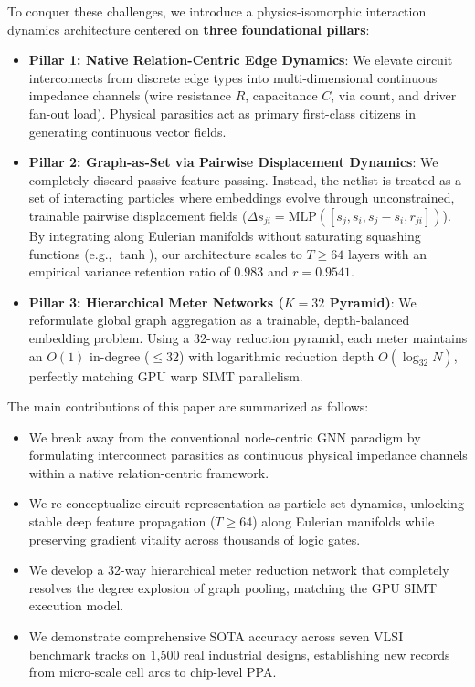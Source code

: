 \documentclass[conference]{IEEEtran}
\begin{document}
To conquer these challenges, we introduce a physics-isomorphic interaction dynamics architecture centered on \textbf{three foundational pillars}:
\begin{itemize}
    \item \textbf{Pillar 1: Native Relation-Centric Edge Dynamics}: We elevate circuit interconnects from discrete edge types into multi-dimensional continuous impedance channels (wire resistance $R$, capacitance $C$, via count, and driver fan-out load). Physical parasitics act as primary first-class citizens in generating continuous vector fields.
    \item \textbf{Pillar 2: Graph-as-Set via Pairwise Displacement Dynamics}: We completely discard passive feature passing. Instead, the netlist is treated as a set of interacting particles where embeddings evolve through unconstrained, trainable pairwise displacement fields ($\Delta s_{ji} = \text{MLP}([s_j, s_i, s_j - s_i, r_{ji}])$). By integrating along Eulerian manifolds without saturating squashing functions (e.g., $\tanh$), our architecture scales to $T \ge 64$ layers with an empirical variance retention ratio of $0.983$ and $r = 0.9541$.
    \item \textbf{Pillar 3: Hierarchical Meter Networks ($K=32$ Pyramid)}: We reformulate global graph aggregation as a trainable, depth-balanced embedding problem. Using a 32-way reduction pyramid, each meter maintains an $O(1)$ in-degree ($\le 32$) with logarithmic reduction depth $O(\log_{32} N)$, perfectly matching GPU warp SIMT parallelism.
\end{itemize}

The main contributions of this paper are summarized as follows:
\begin{itemize}
    \item We break away from the conventional node-centric GNN paradigm by formulating interconnect parasitics as continuous physical impedance channels within a native relation-centric framework.
    \item We re-conceptualize circuit representation as particle-set dynamics, unlocking stable deep feature propagation ($T \ge 64$) along Eulerian manifolds while preserving gradient vitality across thousands of logic gates.
    \item We develop a 32-way hierarchical meter reduction network that completely resolves the degree explosion of graph pooling, matching the GPU SIMT execution model.
    \item We demonstrate comprehensive SOTA accuracy across seven VLSI benchmark tracks on 1,500 real industrial designs, establishing new records from micro-scale cell arcs to chip-level PPA.
\end{itemize}
\end{document}
